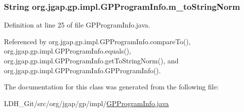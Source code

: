 \hypertarget{classorg_1_1jgap_1_1gp_1_1impl_1_1_g_p_program_info_adb57872b6a7ea2938b8883de2b529b47}{
\subsubsection[{m\-\_\-to\-String\-Norm}]{\setlength{\rightskip}{0pt plus 5cm}String org.\-jgap.\-gp.\-impl.\-G\-P\-Program\-Info.\-m\-\_\-to\-String\-Norm\hspace{0.3cm}{\ttfamily [private]}}}\label{classorg_1_1jgap_1_1gp_1_1impl_1_1_g_p_program_info_adb57872b6a7ea2938b8883de2b529b47}


Definition at line 25 of file G\-P\-Program\-Info.\-java.



Referenced by org.\-jgap.\-gp.\-impl.\-G\-P\-Program\-Info.\-compare\-To(), org.\-jgap.\-gp.\-impl.\-G\-P\-Program\-Info.\-equals(), org.\-jgap.\-gp.\-impl.\-G\-P\-Program\-Info.\-get\-To\-String\-Norm(), and org.\-jgap.\-gp.\-impl.\-G\-P\-Program\-Info.\-G\-P\-Program\-Info().



The documentation for this class was generated from the following file\-:\begin{DoxyCompactItemize}
\item 
L\-D\-H\-\_\-\-Git/src/org/jgap/gp/impl/\hyperlink{_g_p_program_info_8java}{G\-P\-Program\-Info.\-java}\end{DoxyCompactItemize}

